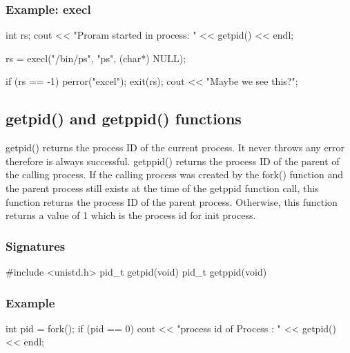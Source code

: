 \documentclass{report}
\begin{document}
        \pagebreak 
        \subsubsection{Example: execl}
        \bigbreak \noindent 
        \begin{cppcode}
        int rs;
        cout << "Proram started in process: " << getpid() << endl;

        rs = execl("/bin/ps", "ps", (char*) NULL);

        if (rs == -1) {
            perror("excel");
            exit(rs);
        }
        cout << "Maybe we see this?\n";
        \end{cppcode}
        
        \bigbreak \noindent 
        \subsection{getpid() and getppid() functions}
        \bigbreak \noindent 
        getpid() returns the process ID of the current process. It never throws any error therefore is always successful.
        \bigbreak \noindent 
        getppid() returns the process ID of the parent of the calling process. If the calling process was created by the fork() function and the parent process still exists at the time of the getppid function call, this function returns the process ID of the parent process. Otherwise, this function returns a value of 1 which is the process id for init process.
        \bigbreak \noindent 
        \subsubsection{Signatures}
        \bigbreak \noindent 
        \begin{cppcode}
            #include <unistd.h>
            pid_t getpid(void)
            pid_t getppid(void)
        \end{cppcode}
        \bigbreak \noindent 
        \subsubsection{Example}
        \bigbreak \noindent 
        \begin{cppcode}
            int pid = fork(); 
            if (pid == 0) {
                cout << "\nCurrent process id of Process : " 
                     << getpid() << endl; 
            }
        \end{cppcode}
        \bigbreak \noindent 
\end{document}
